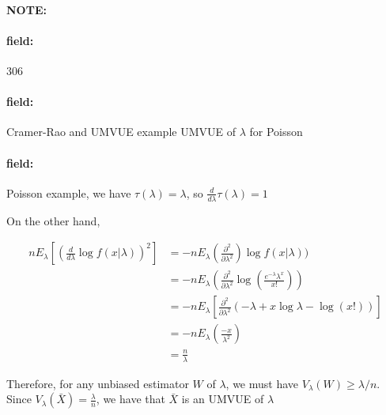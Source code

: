 \documentclass[12pt]{article}
\newenvironment{note}{\paragraph{NOTE:}}{}
\newenvironment{field}{\paragraph{field:}}{}
\begin{document}
\begin{note} \begin{field} \tiny 306 \end{field}
  \begin{field}
    Cramer-Rao and UMVUE example
    UMVUE of $\lambda$ for Poisson
  \end{field}
  \begin{field}
    Poisson example, we have $\tau(\lambda) = \lambda$, so $\frac{d}{d\lambda}\tau(\lambda) = 1$

    On the other hand,

    \begin{align*}
      nE_\lambda[(\frac{d}{d\lambda}\log f(x|\lambda))^2] &= -n E_\lambda(\frac{\partial ^2 }{\partial \lambda ^2}) \log f(x|\lambda))\\
      &= -n E_\lambda(\frac{\partial ^2 }{\partial \lambda ^2} \log (\frac{e^{-\lambda}\lambda^x}{x!}))\\
      &= -n E_\lambda[\frac{\partial ^2 }{\partial \lambda ^2}(-\lambda + x \log \lambda - \log(x!))]\\
      &= -n E_\lambda(\frac{-x}{\lambda^2})\\
      &= \frac{n}{\lambda}
    \end{align*}

    Therefore, for any unbiased estimator $W$ of $\lambda$, we must have $V_\lambda(W) \geq \lambda /n$. Since $V_\lambda(\bar{X}) = \frac{\lambda}{n}$, we have that $\bar{X}$ is an UMVUE of $\lambda$
  \end{field}
\end{note}
\end{document}
